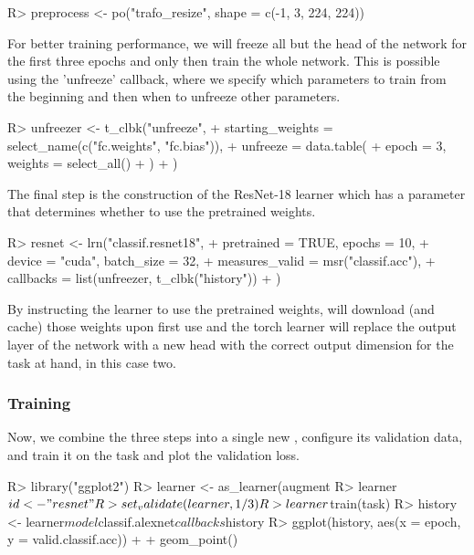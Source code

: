 \documentclass[article]{jss}
\theoremstyle{definition}
\begin{document}
\begin{CodeInput}
R> preprocess <- po("trafo_resize", shape = c(-1, 3, 224, 224))
\end{CodeInput}

For better training performance, we will freeze all but the head of the network for the first three epochs and only then train the whole network.
This is possible using the 'unfreeze' callback, where we specify which parameters to train from the beginning and then when to unfreeze other parameters.

\begin{CodeInput}
R> unfreezer <- t_clbk("unfreeze",
+    starting_weights = select_name(c("fc.weights", "fc.bias")),
+    unfreeze = data.table(
+      epoch = 3, weights = select_all()
+    )
+  )
\end{CodeInput}

The final step is the construction of the ResNet-18 learner which has a parameter  that determines whether to use the pretrained weights.

\begin{CodeInput}
R> resnet <- lrn("classif.resnet18",
+    pretrained = TRUE, epochs = 10,
+    device = "cuda", batch_size = 32,
+    measures_valid = msr("classif.acc"),
+    callbacks = list(unfreezer, t_clbk("history"))
+  )
\end{CodeInput}

By instructing the learner to use the pretrained weights,  will download (and cache) those weights upon first use and the torch learner will replace the output layer of the network with a new head with the correct output dimension for the task at hand, in this case two.

\subsubsection{Training}

Now, we combine the three steps into a single new , configure its validation data, and train it on the task and plot the validation loss.

\begin{CodeInput}
R> library("ggplot2")
R> learner <- as_learner(augment %
R> learner$id <- "resnet"
R> set_validate(learner, 1 / 3)
R> learner$train(task)
R> history <- learner$model$classif.alexnet$callbacks$history
R> ggplot(history, aes(x = epoch, y = valid.classif.acc)) +
+    geom_point()
\end{CodeInput}
\end{document}
